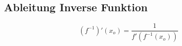 \subsection{Ableitung Inverse Funktion}
    $$
        (f^{-1})'(x_o) = \frac{1}{f'(f^{-1}(x_o))}
    $$